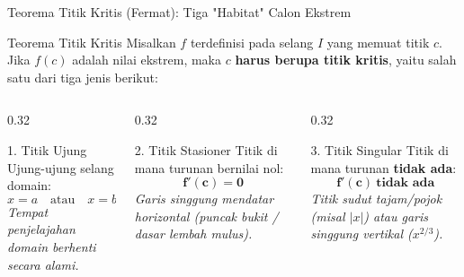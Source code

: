 \documentclass[aspectratio=169,10pt]{beamer}
\begin{document}
\begin{frame}{Teorema Titik Kritis (Fermat): Tiga "Habitat" Calon Ekstrem}
    \begin{block}{Teorema Titik Kritis}
        Misalkan $f$ terdefinisi pada selang $I$ yang memuat titik $c$. Jika $f(c)$ adalah nilai ekstrem, maka $c$ \textbf{harus berupa titik kritis}, yaitu salah satu dari tiga jenis berikut:
    \end{block}

    \vspace{0.15cm}
    \begin{columns}[T]
        \begin{column}{0.32\textwidth}
            \begin{block}{1. Titik Ujung}
                Ujung-ujung selang domain:
                \[
                    x = a \quad \text{atau} \quad x = b
                \]
                {\scriptsize \color{SoftGray} \textit{Tempat penjelajahan domain berhenti secara alami.}}
            \end{block}
        \end{column}

        \begin{column}{0.32\textwidth}
            \begin{exampleblock}{2. Titik Stasioner}
                Titik di mana turunan bernilai nol:
                \[
                    \mathbf{f'(c) = 0}
                \]
                {\scriptsize \color{SoftGray} \textit{Garis singgung mendatar horizontal (puncak bukit / dasar lembah mulus).}}
            \end{exampleblock}
        \end{column}

        \begin{column}{0.32\textwidth}
            \begin{alertblock}{3. Titik Singular}
                Titik di mana turunan \textbf{tidak ada}:
                \[
                    \mathbf{f'(c)\ \text{tidak ada}}
                \]
                {\scriptsize \color{SoftGray} \textit{Titik sudut tajam/pojok (misal $|x|$) atau garis singgung vertikal ($x^{2/3}$).}}
            \end{alertblock}
        \end{column}
    \end{columns}
\end{frame}
\end{document}
